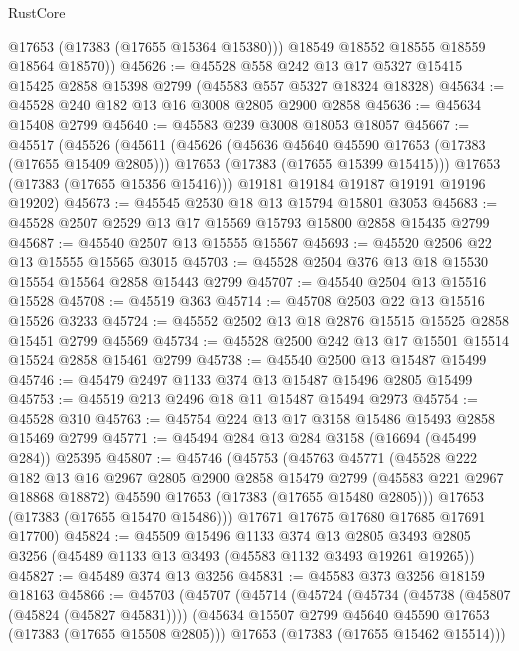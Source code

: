 \begin{lexlean}{RustCore}
\begin{coremodule}
          @17653
          (@17383 (@17655 @15364 @15380)))
        @18549
        @18552
        @18555
        @18559
        @18564
        @18570))
@45626 := @45528
    @558
    @242
    @13
    @17
    @5327
    @15415
    @15425
    @2858
    @15398
    @2799
    (@45583 @557 @5327 @18324 @18328)
@45634 := @45528 @240 @182 @13 @16 @3008 @2805 @2900 @2858
@45636 := @45634 @15408 @2799
@45640 := @45583 @239 @3008 @18053 @18057
@45667 := @45517
    (@45526
      (@45611
        (@45626
          (@45636 @45640 @45590 @17653 (@17383 (@17655 @15409 @2805)))
          @17653
          (@17383 (@17655 @15399 @15415)))
        @17653
        (@17383 (@17655 @15356 @15416)))
      @19181
      @19184
      @19187
      @19191
      @19196
      @19202)
@45673 := @45545 @2530 @18 @13 @15794 @15801 @3053
@45683 := @45528 @2507 @2529 @13 @17 @15569 @15793 @15800 @2858 @15435 @2799
@45687 := @45540 @2507 @13 @15555 @15567
@45693 := @45520 @2506 @22 @13 @15555 @15565 @3015
@45703 := @45528 @2504 @376 @13 @18 @15530 @15554 @15564 @2858 @15443 @2799
@45707 := @45540 @2504 @13 @15516 @15528
@45708 := @45519 @363
@45714 := @45708 @2503 @22 @13 @15516 @15526 @3233
@45724 := @45552 @2502 @13 @18 @2876 @15515 @15525 @2858 @15451 @2799 @45569
@45734 := @45528 @2500 @242 @13 @17 @15501 @15514 @15524 @2858 @15461 @2799
@45738 := @45540 @2500 @13 @15487 @15499
@45746 := @45479 @2497 @1133 @374 @13 @15487 @15496 @2805 @15499
@45753 := @45519 @213 @2496 @18 @11 @15487 @15494 @2973
@45754 := @45528 @310
@45763 := @45754 @224 @13 @17 @3158 @15486 @15493 @2858 @15469 @2799
@45771 := @45494 @284 @13 @284 @3158 (@16694 (@45499 @284)) @25395
@45807 := @45746
    (@45753
      (@45763
        @45771
        (@45528
          @222
          @182
          @13
          @16
          @2967
          @2805
          @2900
          @2858
          @15479
          @2799
          (@45583 @221 @2967 @18868 @18872)
          @45590
          @17653
          (@17383 (@17655 @15480 @2805)))
        @17653
        (@17383 (@17655 @15470 @15486)))
      @17671
      @17675
      @17680
      @17685
      @17691
      @17700)
@45824 := @45509
    @15496
    @1133
    @374
    @13
    @2805
    @3493
    @2805
    @3256
    (@45489 @1133 @13 @3493 (@45583 @1132 @3493 @19261 @19265))
@45827 := @45489 @374 @13 @3256
@45831 := @45583 @373 @3256 @18159 @18163
@45866 := @45703
    (@45707
      (@45714
        (@45724
          (@45734
            (@45738 (@45807 (@45824 (@45827 @45831))))
            (@45634 @15507 @2799 @45640 @45590 @17653 (@17383 (@17655 @15508 @2805)))
            @17653
            (@17383 (@17655 @15462 @15514)))

\end{coremodule}
\end{lexlean}
